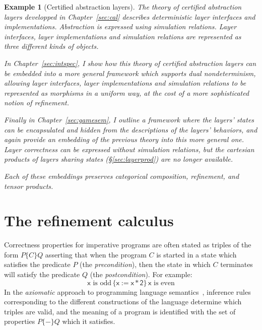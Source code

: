 \documentclass[11pt,oneside,draft]{book}
\newtheorem{example}[theorem]{Example}
\theoremstyle{definition}
\newcommand{\kw}[1]{\ensuremath{ \mathsf{#1} }}
\newcommand{\htr}[3]{{ {#1} \lbrace {#2} \rbrace {#3} }}
\begin{document}
\begin{example}[Certified abstraction layers] %
The theory of certified abstraction layers
developped in Chapter~\ref{sec:cal}
describes deterministic layer interfaces
and implementations.
Abstraction is expressed using simulation relations.
Layer interfaces, layer implementations and simulation relations
are represented as three different kinds of objects.

In Chapter~\ref{sec:intspec},
I show how this theory of certified abstraction layers
can be embedded into a more general framework
which supports dual nondeterminism,
allowing layer interfaces, layer implementations and simulation relations
to be represented as morphisms in a uniform way,
at the cost of a more sophisticated notion of refinement.

Finally in Chapter~\ref{sec:gamesem},
I outline a framework where the layers' states
can be encapsulated and hidden from
the descriptions of the layers' behaviors,
and again provide an embedding of the previous theory
into this more general one.
Layer correctness can be expressed
without simulation relations,
but the cartesian products
of layers sharing states (\S\ref{sec:layerprod})
are no longer available.

Each of these embeddings preserves categorical composition,
refinement, and tensor products.
\end{example}



\section{The refinement calculus} \label{sec:refcal} %


Correctness properties for imperative programs
are often stated as triples of the form $\htr{P}{C}{Q}$
asserting that
when the program $C$ is started in a state which
satisfies the predicate $P$ (the \emph{precondition}),
then the state in which $C$ terminates
will satisfy the predicate $Q$ (the \emph{postcondition}).
For example:
\[
    \htr{\text{$\kw{x}$ is odd}\,}{\kw{x := x * 2}}{\,\text{$\kw{x}$ is even}}
\]
In the \emph{axiomatic} approach
to programming language semantics~\citep{hoare69},
inference rules
corresponding to the different constructions of the language
determine which triples are valid,
and the meaning of a program is identified with
the set of properties $\htr{P}{-}{Q}$
which it satisfies.
\end{document}
